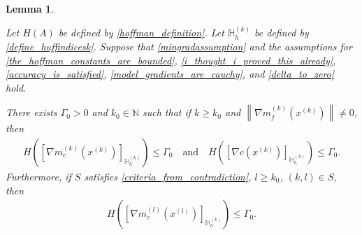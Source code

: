 \documentclass{article}
\newtheorem{lemma}[theorem]{Lemma}
\theoremstyle{case}
\numberwithin{theorem}{subsection}
\newcommand{\gk}{{\nabla m_f^{(k)}\left(\xk\right)}}
\newcommand{\huff}{{\Gamma_0}}
\newcommand{\naturals}{\mathbb N}
\newcommand{\xk}{x^{(k)}}
\newcommand{\xl}{{x^{(l)}}}
\newcommand{\huffindicesk}{{ \mathbb H_h^{(k)} }}
\newcommand{\modeljack}{{ \nabla m^{(k)}_{c}\left(\xk\right) }}
\newcommand{\modeljacl}{{ \nabla m^{(l)}_{c}\left(\xl\right) }}
\newcommand{\truejack}{{ \nabla c\left(\xk\right) }}
\begin{document}
\begin{lemma}
\label{huffman_constants_of_hoffman_indices_are_bounded}

Let $H(A)$ be defined by \cref{hoffman_definition}.
Let $\huffindicesk$ be defined by \cref{define_huffindicesk}.
Suppose that 
\cref{mingradassumption}
and the assumptions for
\cref{the_hoffman_constants_are_bounded}, \cref{i_thought_i_proved_this_already}, \cref{accuracy_is_satisfied}, \cref{model_gradients_are_cauchy}, and \cref{delta_to_zero}
hold.

There exists $\huff > 0$ and $k_0 \in \naturals$ such that if $k \ge k_0$ and $\left\|\gk\right\| \ne 0$, then
\begin{align*}
H\left(\left[\modeljack\right]_{\huffindicesk}\right) \le \huff
\quad \textrm{and} \quad
H\left(\left[\truejack\right]_{\huffindicesk}\right) \le \huff.
\end{align*}
Furthermore, if $S$ satisfies \cref{criteria_from_contradiction}, $l \ge k_0$, $(k, l) \in S$, then
\begin{align*}
H\left(\left[\modeljacl\right]_{\huffindicesk}\right) \le \huff.
\end{align*}
\end{lemma}
\end{document}
